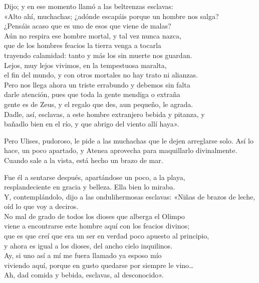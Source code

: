 \begin{versocita}
Dijo; y en ese momento llamó a las beltrenzas esclavas:\\
«Alto ahí, muchachas; ¿adónde escapáis porque un hombre nos salga?\\
¿Pensáis acaso que es uno de esos que viene de malas?\\
Aún no respira ese hombre mortal, y tal vez nunca nazca,\\
que de los hombres feacios la tierra venga a tocarla\\
trayendo calamidad: tanto y más los sin muerte nos guardan.\\
Lejos, muy lejos vivimos, en la tempestuosa maralta,\\
el fin del mundo, y con otros mortales no hay trato ni alianzas.\\
Pero nos llega ahora un triste errabundo y debemos sin falta\\
darle atención, pues que toda la gente mendiga o extraña\\
gente es de Zeus, y el regalo que des, aun pequeño, le agrada.\\
Dadle, así, esclavas, a este hombre extranjero bebida y pitanza, y\\
bañadlo bien en el río, y que abrigo del viento allí haya».
\end{versocita}

Pero Ulises, pudoroso, le pide a las muchachas que le dejen arreglarse solo. Así lo hace, un poco apartado, y Atenea aprovecha para maquillarlo divinalmente. Cuando sale a la vista, está hecho un brazo de mar.


\begin{versocita}
Fue él a sentarse después, apartándose un poco, a la playa,\\
resplandeciente en gracia y belleza. Ella bien lo miraba.\\
Y, contemplándolo, dijo a las ondulihermosas esclavas:
\stanzabreak
«Niñas de brazos de leche, oíd lo que voy a deciros.\\
No mal de grado de todos los dioses que alberga el Olimpo\\
viene a encontrarse este hombre aquí con los feacios divinos;\\
que es que creí que era un ser en verdad poco apuesto al principio,\\
y ahora es igual a los dioses, del ancho cielo inquilinos.\\
Ay, si uno así a mí me fuera llamado ya esposo mío\\
viviendo aquí, porque en gusto quedarse por siempre le vino…\\
Ah, dad comida y bebida, esclavas, al desconocido».
\end{versocita}

